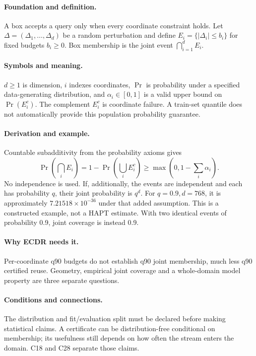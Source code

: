 \paragraph{Foundation and definition.}
A box accepts a query only when every coordinate constraint holds. Let
$\Delta=(\Delta_1,\ldots,\Delta_d)$ be a random perturbation and define
$E_i=\{|\Delta_i|\le b_i\}$ for fixed budgets $b_i\ge0$.
Box membership is the joint event $\bigcap_{i=1}^dE_i$.
\paragraph{Symbols and meaning.}
$d\ge1$ is dimension, $i$ indexes coordinates, $\Pr$ is probability under
a specified data-generating distribution, and $\alpha_i\in[0,1]$ is a
valid upper bound on $\Pr(E_i^c)$. The complement $E_i^c$ is coordinate
failure. A train-set quantile does not automatically provide this
population probability guarantee.
\paragraph{Derivation and example.}
Countable subadditivity from the probability axioms gives
\[
 \Pr\!\left(\bigcap_iE_i\right)
 =1-\Pr\!\left(\bigcup_iE_i^c\right)
 \ge\max\left(0,1-\sum_i\alpha_i\right).
\]
No independence is used. If, additionally, the events are independent and
each has probability $q$, their joint probability is $q^d$.
For $q=0.9,d=768$, it is approximately $7.21518\times10^{-36}$ under
that added assumption. This is a constructed example, not a HAPT estimate.
With two identical events of probability 0.9, joint coverage is instead 0.9.
\paragraph{Why ECDR needs it.}
Per-coordinate q90 budgets do not establish q90 joint membership, much
less q90 certified reuse. Geometry, empirical joint coverage and a
whole-domain model property are three separate questions.
\paragraph{Conditions and connections.}
The distribution and fit/evaluation split must be declared before making
statistical claims. A certificate can be distribution-free conditional on
membership; its usefulness still depends on how often the stream enters
the domain. C18 and C28 separate those claims.

